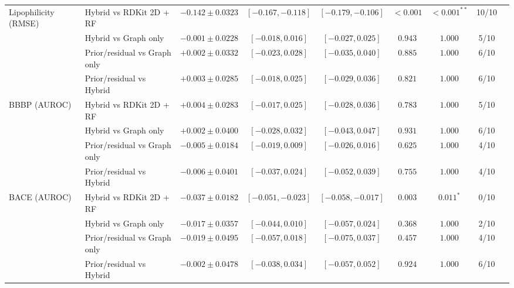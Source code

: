 \begin{table}[H]
\begin{tabular}{@{}llccccccc@{}}
\midrule
Lipophilicity (RMSE) & Hybrid vs RDKit 2D + RF & $-0.142\pm0.0323$ & $[-0.167,-0.118]$ & $[-0.179,-0.106]$ & $<0.001$ & $<0.001^{**}$ & 10/10 \\
 & Hybrid vs Graph only & $-0.001\pm0.0228$ & $[-0.018,0.016]$ & $[-0.027,0.025]$ & $0.943$ & $1.000$ & 5/10 \\
 & Prior/residual vs Graph only & $+0.002\pm0.0332$ & $[-0.023,0.028]$ & $[-0.035,0.040]$ & $0.885$ & $1.000$ & 6/10 \\
 & Prior/residual vs Hybrid & $+0.003\pm0.0285$ & $[-0.018,0.025]$ & $[-0.029,0.036]$ & $0.821$ & $1.000$ & 6/10 \\
\midrule
BBBP (AUROC) & Hybrid vs RDKit 2D + RF & $+0.004\pm0.0283$ & $[-0.017,0.025]$ & $[-0.028,0.036]$ & $0.783$ & $1.000$ & 5/10 \\
 & Hybrid vs Graph only & $+0.002\pm0.0400$ & $[-0.028,0.032]$ & $[-0.043,0.047]$ & $0.931$ & $1.000$ & 6/10 \\
 & Prior/residual vs Graph only & $-0.005\pm0.0184$ & $[-0.019,0.009]$ & $[-0.026,0.016]$ & $0.625$ & $1.000$ & 4/10 \\
 & Prior/residual vs Hybrid & $-0.006\pm0.0401$ & $[-0.037,0.024]$ & $[-0.052,0.039]$ & $0.755$ & $1.000$ & 4/10 \\
\midrule
BACE (AUROC) & Hybrid vs RDKit 2D + RF & $-0.037\pm0.0182$ & $[-0.051,-0.023]$ & $[-0.058,-0.017]$ & $0.003$ & $0.011^{*}$ & 0/10 \\
 & Hybrid vs Graph only & $-0.017\pm0.0357$ & $[-0.044,0.010]$ & $[-0.057,0.024]$ & $0.368$ & $1.000$ & 2/10 \\
 & Prior/residual vs Graph only & $-0.019\pm0.0495$ & $[-0.057,0.018]$ & $[-0.075,0.037]$ & $0.457$ & $1.000$ & 4/10 \\
 & Prior/residual vs Hybrid & $-0.002\pm0.0478$ & $[-0.038,0.034]$ & $[-0.057,0.052]$ & $0.924$ & $1.000$ & 6/10 \\
\bottomrule
\end{tabular}
\end{table}
